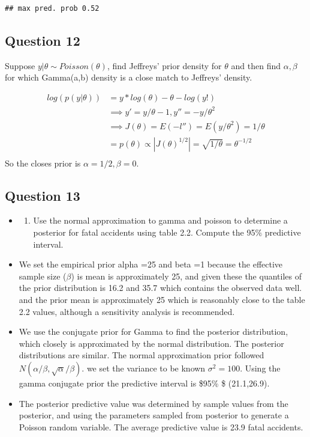 \documentclass[
]{book}
\providecommand{\tightlist}{%
  \setlength{\itemsep}{0pt}\setlength{\parskip}{0pt}}
\theoremstyle{definition}
\theoremstyle{definition}
\theoremstyle{definition}
\theoremstyle{definition}
\theoremstyle{remark}
\begin{document}
\begin{verbatim}
## max pred. prob 0.52
\end{verbatim}

\hypertarget{question-12}{%
\subsection*{Question 12}\label{question-12}}

Suppose \(y|\theta \sim Poisson(\theta)\), find Jeffreys' prior density for \(\theta\) and then find \(\alpha,\beta\) for which Gamma(a,b) density is a close match to Jeffreys' density.

\[
\begin{aligned}
 log(p(y|\theta))&= y*log(\theta)-\theta -log(y!)\\
 &\implies y' = y/\theta - 1 ,  y'' = -y/\theta^2 \\
 &\implies J(\theta)= E(- l'')= E(y/\theta^2)= 1/\theta \\
 &= p(\theta)\propto |J(\theta)^{1/2}| = \sqrt{1/\theta} = \theta^{-1/2}\\
\end{aligned}
\]
So the closes prior is \(\alpha=1/2 , \beta=0\).

\hypertarget{question-13}{%
\subsection*{Question 13}\label{question-13}}

\begin{itemize}
\item
  \begin{enumerate}
  \def\labelenumi{(\alph{enumi})}
  \tightlist
  \item
    Use the normal approximation to gamma and poisson to determine a posterior for fatal accidents using table 2.2. Compute the 95\(\%\) predictive interval.
  \end{enumerate}
\item
  We set the empirical prior alpha =25 and beta =1 because the effective sample size (\(\beta\)) is mean is approximately 25, and given these the quantiles of the prior distribution is 16.2 and 35.7 which contains the observed data well. and the prior mean is approximately 25 which is reasonably close to the table 2.2 values, although a sensitivity analysis is recommended.
\item
  We use the conjugate prior for Gamma to find the posterior distribution, which closely is approximated by the normal distribution. The posterior distributions are similar. The normal approximation prior followed \(N(\alpha/\beta, \sqrt{\alpha}/\beta)\). we set the variance to be known \(\sigma^2=100\). Using the gamma conjugate prior the predictive interval is \$95\% \$ (21.1,26.9).
\item
  The posterior predictive value was determined by sample values from the posterior, and using the parameters sampled from posterior to generate a Poisson random variable. The average predictive value is 23.9 fatal accidents.
\end{itemize}
\end{document}
